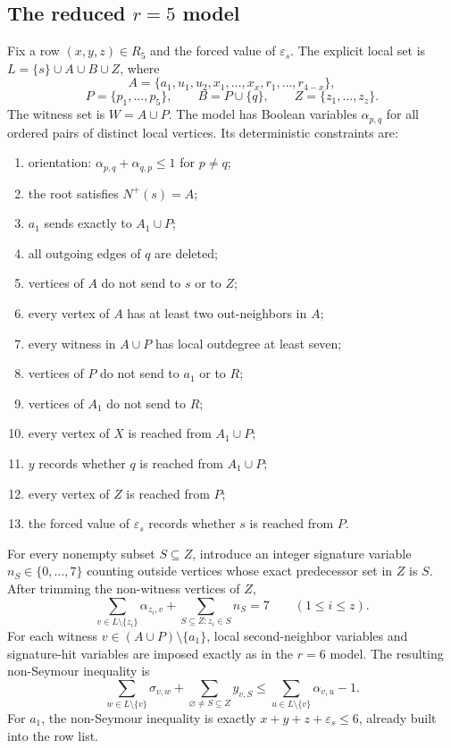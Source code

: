\documentclass[a4paper,fleqn]{cas-sc}
\theoremstyle{definition}
\begin{document}
\subsection*{The reduced $r=5$ model}
Fix a row $(x,y,z)\in R_5$ and the forced value of $\varepsilon_s$.  The explicit local set is $L=\{s\}\cup A\cup B\cup Z$, where
\[
A=\{a_1,u_1,u_2,x_1,\ldots,x_x,r_1,\ldots,r_{4-x}\},
\]
\[
P=\{p_1,\ldots,p_5\},
\qquad B=P\cup\{q\},
\qquad Z=\{z_1,\ldots,z_z\}.
\]
The witness set is $W=A\cup P$.
The model has Boolean variables $\alpha_{p,q}$ for all ordered pairs of distinct local vertices.  Its deterministic constraints are:
\begin{enumerate}[label=(R5.\arabic*)]
\item orientation: $\alpha_{p,q}+\alpha_{q,p}\le 1$ for $p\ne q$;
\item the root satisfies $N^+(s)=A$;
\item $a_1$ sends exactly to $A_1\cup P$;
\item all outgoing edges of $q$ are deleted;
\item vertices of $A$ do not send to $s$ or to $Z$;
\item every vertex of $A$ has at least two out-neighbors in $A$;
\item every witness in $A\cup P$ has local outdegree at least seven;
\item vertices of $P$ do not send to $a_1$ or to $R$;
\item vertices of $A_1$ do not send to $R$;
\item every vertex of $X$ is reached from $A_1\cup P$;
\item $y$ records whether $q$ is reached from $A_1\cup P$;
\item every vertex of $Z$ is reached from $P$;
\item the forced value of $\varepsilon_s$ records whether $s$ is reached from $P$.
\end{enumerate}
For every nonempty subset $S\subseteq Z$, introduce an integer signature variable $n_S\in\{0,\ldots,7\}$ counting outside vertices whose exact predecessor set in $Z$ is $S$.  After trimming the non-witness vertices of $Z$,
\begin{equation}\label{eq:r5-trim}
\sum_{v\in L\setminus\{z_i\}}\alpha_{z_i,v}
+
\sum_{S\subseteq Z:z_i\in S} n_S=7
\qquad(1\le i\le z).
\end{equation}
For each witness $v\in(A\cup P)\setminus\{a_1\}$, local second-neighbor variables and signature-hit variables are imposed exactly as in the $r=6$ model.  The resulting non-Seymour inequality is
\begin{equation}\label{eq:r5-NS}
\sum_{w\in L\setminus\{v\}}\sigma_{v,w}
+
\sum_{\varnothing\ne S\subseteq Z} y_{v,S}
\le
\sum_{u\in L\setminus\{v\}}\alpha_{v,u}-1.
\end{equation}
For $a_1$, the non-Seymour inequality is exactly $x+y+z+\varepsilon_s\le 6$, already built into the row list.
\end{document}
